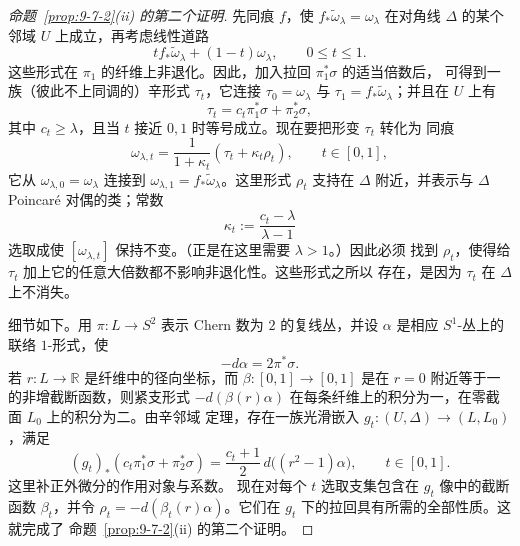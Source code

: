 \begin{proof}[命题~\ref{prop:9-7-2}(ii) 的第二个证明]
先同痕 $f$，使 $f_*\widetilde\omega_\lambda=\omega_\lambda$ 在对角线 $\Delta$ 的某个
邻域 $U$ 上成立，再考虑线性道路
\[
  t f_*\widetilde\omega_\lambda+(1-t)\omega_\lambda,
  \qquad 0\le t\le1.
\]
这些形式在 $\pi_1$ 的纤维上非退化。因此，加入拉回 $\pi_1^*\sigma$ 的适当倍数后，
可得到一族（彼此不上同调的）辛形式 $\tau_t$，它连接
$\tau_0=\omega_\lambda$ 与 $\tau_1=f_*\widetilde\omega_\lambda$；并且在 $U$ 上有
\[
  \tau_t=c_t\pi_1^*\sigma+\pi_2^*\sigma,
\]
其中 $c_t\ge\lambda$，且当 $t$ 接近 $0,1$ 时等号成立。现在要把形变 $\tau_t$ 转化为
同痕
\[
  \omega_{\lambda,t}
  =\frac1{1+\kappa_t}(\tau_t+\kappa_t\rho_t),
  \qquad t\in[0,1],
\]
它从 $\omega_{\lambda,0}=\omega_\lambda$ 连接到
$\omega_{\lambda,1}=f_*\widetilde\omega_\lambda$。这里形式 $\rho_t$ 支持在 $\Delta$
附近，并表示与 $\Delta$ Poincaré 对偶的类；常数
\[
  \kappa_t:=\frac{c_t-\lambda}{\lambda-1}
\]
选取成使 $[\omega_{\lambda,t}]$ 保持不变。（正是在这里需要 $\lambda>1$。）因此必须
找到 $\rho_t$，使得给 $\tau_t$ 加上它的任意大倍数都不影响非退化性。这些形式之所以
存在，是因为 $\tau_t$ 在 $\Delta$ 上不消失。

细节如下。用 $\pi:L\to S^2$ 表示 Chern 数为 $2$ 的复线丛，并设 $\alpha$ 是相应
$S^1$-丛上的联络 $1$-形式，使
\[
  -d\alpha=2\pi^*\sigma.
\]
若 $r:L\to\mathbb R$ 是纤维中的径向坐标，而
$\beta:[0,1]\to[0,1]$ 是在 $r=0$ 附近等于一的非增截断函数，则紧支形式
$-d(\beta(r)\alpha)$ 在每条纤维上的积分为一，在零截面 $L_0$ 上的积分为二。由辛邻域
定理，存在一族光滑嵌入 $g_t:(U,\Delta)\to(L,L_0)$，满足
\[
  (g_t)_*(c_t\pi_1^*\sigma+\pi_2^*\sigma)
  =\frac{c_t+1}{2}\,d\bigl((r^2-1)\alpha\bigr),
  \qquad t\in[0,1].
\]
这里补正外微分的作用对象与系数。
现在对每个 $t$ 选取支集包含在 $g_t$ 像中的截断函数 $\beta_t$，并令
$\rho_t=-d(\beta_t(r)\alpha)$。它们在 $g_t$ 下的拉回具有所需的全部性质。这就完成了
命题~\ref{prop:9-7-2}(ii) 的第二个证明。
\end{proof}

